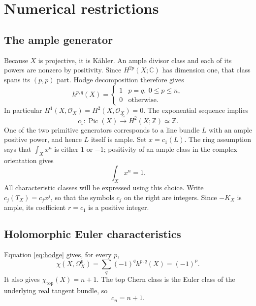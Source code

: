 \documentclass[11pt,reqno,letterpaper]{amsart}
\newcommand{\Z}{\mathbb Z}
\newcommand{\C}{\mathbb C}
\newcommand{\Pic}{\operatorname{Pic}}
\newcommand{\OO}{\mathcal O}
\theoremstyle{definition}
\numberwithin{equation}{section}
\begin{document}
\section{Numerical restrictions}\label{sec:basic}

\subsection{The ample generator}
Because $X$ is projective, it is K\"ahler. An ample divisor class and each of its
powers are nonzero by positivity. Since $H^{2p}(X;\C)$ has dimension one, that
class spans its $(p,p)$ part. Hodge decomposition therefore gives
\begin{equation}\label{eq:hodge}
 h^{p,q}(X)=
 \begin{cases}1&p=q,\ 0\le p\le n,\\0&\text{otherwise}.\end{cases}
\end{equation}
In particular $H^1(X,\OO_X)=H^2(X,\OO_X)=0$. The exponential sequence implies
\[
 c_1:\Pic(X)\xrightarrow{\ \simeq\ }H^2(X;\Z)\simeq\Z.
\]
One of the two primitive generators corresponds to a line bundle $L$ with an
ample positive power, and hence $L$ itself is ample. Set $x=c_1(L)$.
The ring assumption says that $\int_Xx^n$ is either $1$ or $-1$; positivity of
an ample class in the complex orientation gives
\begin{equation}\label{eq:degreeone}
 \int_Xx^n=1.
\end{equation}
All characteristic classes will be expressed using this choice. Write
$c_j(T_X)=c_jx^j$, so that the symbols $c_j$ on the right are integers.
Since $-K_X$ is ample, its coefficient $r=c_1$ is a positive integer.

\subsection{Holomorphic Euler characteristics}
Equation \eqref{eq:hodge} gives, for every $p$,
\begin{equation}\label{eq:chiOmega}
 \chi(X,\Omega_X^p)=\sum_q(-1)^q h^{p,q}(X)=(-1)^p.
\end{equation}
It also gives $\chi_{\mathrm{top}}(X)=n+1$. The top Chern class is the Euler
class of the underlying real tangent bundle, so
\begin{equation}\label{eq:cn}
 c_n=n+1.
\end{equation}
\end{document}
